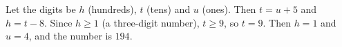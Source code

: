 Let the digits be $h$ (hundreds), $t$ (tens) and $u$ (ones). Then $t=u+5$ and $h=t-8$. Since $h\ge1$ (a three-digit number), $t\ge9$, so $t=9$. Then $h=1$ and $u=4$, and the number is $\boxed{194}$.
